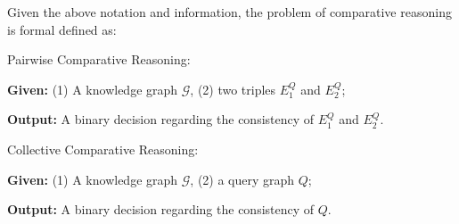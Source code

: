 Given the above notation and information, the problem of comparative reasoning is formal defined as: 

\begin{pro-stat}{Pairwise Comparative Reasoning: }
	
	\textbf{Given:} (1) A knowledge graph $\mathcal{G}$, (2) two triples $E^Q_1$ and $E^Q_2$;
	
	\textbf{Output:} A binary decision regarding the consistency of $E^Q_1$ and $E^Q_2$.
	
\end{pro-stat}




\begin{pro-stat}{Collective Comparative Reasoning: }
	
	\textbf{Given:} (1) A knowledge graph $\mathcal{G}$, (2) a query graph ${Q}$;
	
	\textbf{Output:}  A binary decision regarding the consistency of ${Q}$.
	
\end{pro-stat}





